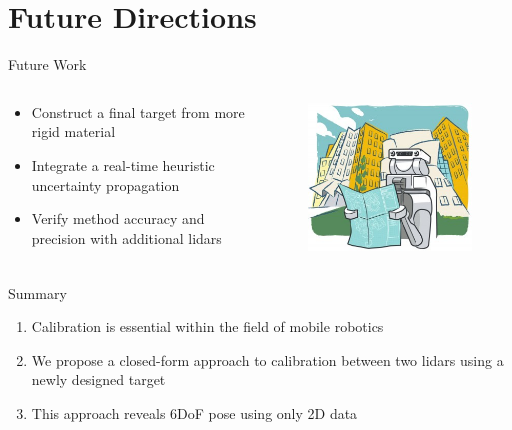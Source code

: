 \documentclass{beamer}
\begin{document}
\section{Future Directions}
\begin{frame}{Future Work}
    \begin{columns}[T]
        \begin{column}{.5\textwidth}
            \begin{itemize}
            \item{Construct a \alert{final target} from more rigid material}
            \item{Integrate a \alert{real-time heuristic} uncertainty propagation}
            \item{Verify method accuracy and precision with \alert{additional lidars}}
        \end{itemize}
        \end{column}
        \begin{column}{.5\textwidth}
            \begin{figure}
                \centering
                \includegraphics[width=\textwidth]{Images/pr2_map.jpg}
            \end{figure}
        \end{column}
    \end{columns} 
\end{frame}


\begin{frame}{Summary}
    \begin{enumerate}
        \item{Calibration is essential within the field of \alert{mobile robotics}}
        \item{We propose a \alert{closed-form} approach to calibration between two lidars using a newly designed target}
        \item{This approach reveals \alert{6DoF pose} using only 2D data}
    \end{enumerate}
    \begin{center}
        \fontsize{50pt}{10pt}\selectfont{ Questions?}
    \end{center}
\end{frame}
\end{document}
